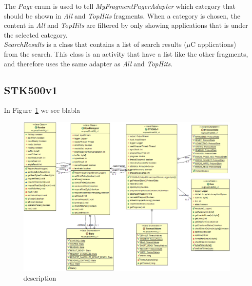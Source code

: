 	The \textit{Page} enum is used to tell \textit{MyFragmentPagerAdapter} which category that should be shown in \textit{All} and \textit{TopHits} fragments. When a category is chosen, the content in \textit{All} and \textit{TopHits} are filtered by only showing applications that is under the selected category.\\

	\textit{SearchResults} is a class that contains a list of search results ($\mu$C applications) from the search. This class is an activity that have a list like the other fragments, and therefore uses the same adapter as \textit{All} and \textit{TopHits}. 

	\subsection{STK500v1}
	In Figure~\ref{fig:stk500v1uml} we see blabla

	\begin{figure}[H]
	\hspace*{-1.0in}
	\includegraphics[scale=0.5]{images/UML/stk500v1.png}
	\caption[UML - Main GUI]{description}
	\label{fig:stk500v1uml}
	\end{figure}


